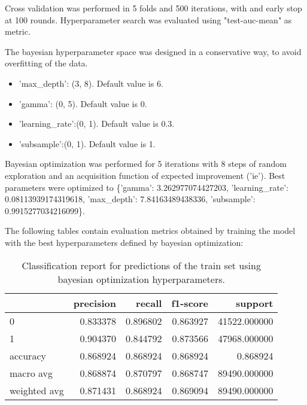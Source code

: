 \documentclass{article}
\begin{document}
\begin{itemize}
\begin{itemize}
\end{itemize}

Cross validation was performed in 5 folds and 500 iterations, with and early stop at 100 rounds.
Hyperparameter search was evaluated using "test-auc-mean" as metric.

The bayesian hyperparameter space was designed in a conservative way, to avoid overfitting of the data.
\begin{itemize}
	\item 'max\_depth': (3, 8).  Default value is 6. 
	\item 'gamma': (0, 5). Default value is 0.
	\item 'learning\_rate':(0, 1). Default value is 0.3.
	\item 'subsample':(0, 1). Default value is 1.
\end{itemize}

Bayesian optimization was performed for 5 iterations with 8 steps of random exploration and an acquisition function of expected improvement ('ie'). Best parameters were optimized to \{'gamma': 3.262977074427203, 'learning\_rate': 0.08113939174319618, 'max\_depth': 7.84163489438336, 'subsample': 0.9915277034216099\}.

The following tables contain evaluation metrics obtained by training the model with the best hyperparameters defined by bayesian optimization:

\begin{table}[h!]
\centering
\begin{tabular}{lrrrr}
\toprule
{} &  precision &    recall &  f1-score &       support \\
\midrule
0            &   0.833378 &  0.896802 &  0.863927 &  41522.000000 \\
1            &   0.904370 &  0.844792 &  0.873566 &  47968.000000 \\
accuracy     &   0.868924 &  0.868924 &  0.868924 &      0.868924 \\
macro avg    &   0.868874 &  0.870797 &  0.868747 &  89490.000000 \\
weighted avg &   0.871431 &  0.868924 &  0.869094 &  89490.000000 \\
\bottomrule
\end{tabular}
\caption{Classification report for predictions of the train set using bayesian optimization hyperparameters.}
\label{table:model_tr_bo_cr}
\end{table}

\begin{table}[h!]
\centering


\end{table}
\end{itemize}
\end{document}
